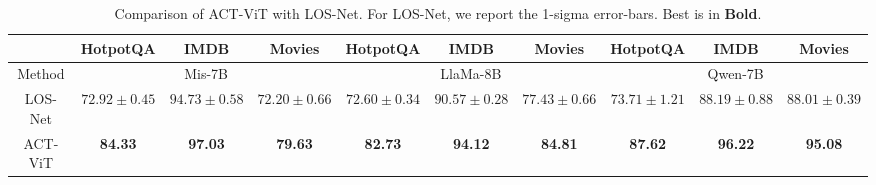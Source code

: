 \begin{table}[t]
\centering
\caption{Comparison of ACT-ViT with LOS-Net. For LOS-Net, we report the 1-sigma error-bars.
Best is in \textbf{Bold}.}
\label{tab:losnet}
\setlength{\tabcolsep}{3pt}
\renewcommand{\arraystretch}{1.15}
\scriptsize
\begin{tabular}{|c|ccc|ccc|ccc|}
\hline
 & HotpotQA & IMDB & Movies & HotpotQA & IMDB & Movies & HotpotQA & IMDB & Movies \\
\hline
Method & \multicolumn{3}{c|}{Mis-7B} & \multicolumn{3}{c|}{LlaMa-8B} & \multicolumn{3}{c|}{Qwen-7B} \\
\hline
LOS-Net & $72.92 \pm 0.45$ & $94.73 \pm 0.58$ & $72.20 \pm 0.66$ & $72.60 \pm 0.34$ & $90.57 \pm 0.28$ & $77.43 \pm 0.66$ & $73.71 \pm 1.21$ & $88.19 \pm 0.88$ & $88.01 \pm 0.39$ \\
\hline
ACT-ViT & \textbf{84.33} & \textbf{97.03} & \textbf{79.63} & \textbf{82.73} & \textbf{94.12} & \textbf{84.81} & \textbf{87.62} & \textbf{96.22} & \textbf{95.08} \\
\hline
\end{tabular}
\end{table}
